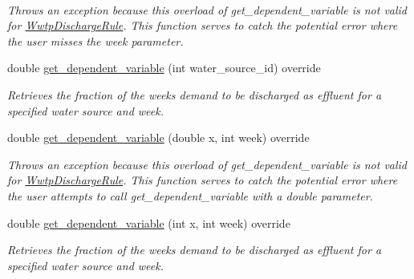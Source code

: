 \begin{DoxyCompactItemize}
$$\begin{DoxyCompactList}\small\item\em Throws an exception because this overload of {\ttfamily get\+\_\+dependent\+\_\+variable} is not valid for {\ttfamily \mbox{\hyperlink{classWwtpDischargeRule}{Wwtp\+Discharge\+Rule}}}. This function serves to catch the potential error where the user misses the {\ttfamily week} parameter. \end{DoxyCompactList}\item 
double \mbox{\hyperlink{classWwtpDischargeRule_a3338c0fc43d656a6730ca72dd5d3e51e}{get\+\_\+dependent\+\_\+variable}} (int water\+\_\+source\+\_\+id) override
\begin{DoxyCompactList}\small\item\em Retrieves the fraction of the week\textquotesingle{}s demand to be discharged as effluent for a specified water source and week. \end{DoxyCompactList}\item 
double \mbox{\hyperlink{classWwtpDischargeRule_a10eb6f901b6479dadc107e0a7c07e03b}{get\+\_\+dependent\+\_\+variable}} (double x, int week) override
\begin{DoxyCompactList}\small\item\em Throws an exception because this overload of {\ttfamily get\+\_\+dependent\+\_\+variable} is not valid for {\ttfamily \mbox{\hyperlink{classWwtpDischargeRule}{Wwtp\+Discharge\+Rule}}}. This function serves to catch the potential error where the user attempts to call {\ttfamily get\+\_\+dependent\+\_\+variable} with a double parameter. \end{DoxyCompactList}\item 
double \mbox{\hyperlink{classWwtpDischargeRule_a8eade5d595ec0fdc76769e67c7ffc5f4}{get\+\_\+dependent\+\_\+variable}} (int x, int week) override
\begin{DoxyCompactList}\small\item\em Retrieves the fraction of the week\textquotesingle{}s demand to be discharged as effluent for a specified water source and week. \end{DoxyCompactList}\end{DoxyCompactItemize}
